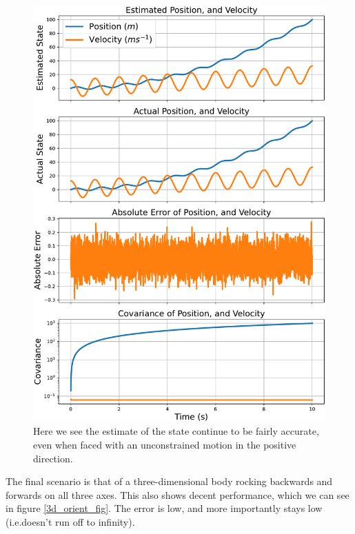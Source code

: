 \documentclass[12pt]{article}
\begin{document}
\begin{figure}[thp]
	\centering
	
	\includegraphics[height=0.8\textheight]{1d-velocity.pdf}
	
	\caption{Here we see the estimate of the state continue to be fairly accurate, even when faced with an unconstrained motion in the positive direction.}
	\label{1d_velocity_fig}
\end{figure}

The final scenario is that of a three-dimensional body rocking backwards and forwards on all three axes. This also shows decent performance, which we can see in figure \ref{3d_orient_fig}. The error is low, and more importantly stays low (i.e.\@ doesn't run off to infinity).
\end{document}
